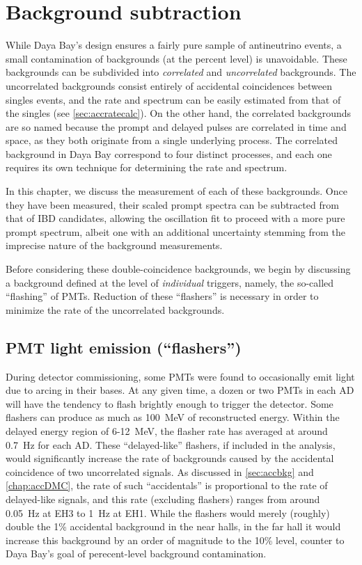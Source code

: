 \documentclass[../thesis.tex]{subfiles}
\begin{document}
\chapter{Background subtraction}
\label{chap:bkg}

While Daya Bay's design ensures a fairly pure sample of antineutrino events, a small contamination of backgrounds (at the percent level) is unavoidable. These backgrounds can be subdivided into \emph{correlated} and \emph{uncorrelated} backgrounds. The uncorrelated backgrounds consist entirely of accidental coincidences between singles events, and the rate and spectrum can be easily estimated from that of the singles (see \autoref{sec:accratecalc}). On the other hand, the correlated backgrounds are so named because the prompt and delayed pulses are correlated in time and space, as they both originate from a single underlying process. The correlated background in Daya Bay correspond to four distinct processes, and each one requires its own technique for determining the rate and spectrum.

In this chapter, we discuss the measurement of each of these backgrounds. Once they have been measured, their scaled prompt spectra can be subtracted from that of IBD candidates, allowing the oscillation fit to proceed with a more pure prompt spectrum, albeit one with an additional uncertainty stemming from the imprecise nature of the background measurements.

Before considering these double-coincidence backgrounds, we begin by discussing a background defined at the level of \emph{individual} triggers, namely, the so-called ``flashing'' of PMTs. Reduction of these ``flashers'' is necessary in order to minimize the rate of the uncorrelated backgrounds.

\section{PMT light emission (``flashers'')}
\label{sec:bkgFlashers}

During detector commissioning, some PMTs were found to occasionally emit light due to arcing in their bases. At any given time, a dozen or two PMTs in each AD will have the tendency to flash brightly enough to trigger the detector. Some flashers can produce as much as 100~MeV of reconstructed energy. Within the delayed energy region of 6-12~MeV, the flasher rate has averaged at around 0.7~Hz for each AD. These ``delayed-like'' flashers, if included in the analysis, would significantly increase the rate of backgrounds caused by the accidental coincidence of two uncorrelated signals. As discussed in \autoref{sec:accbkg} and \autoref{chap:accDMC}, the rate of such ``accidentals'' is proportional to the rate of delayed-like signals, and this rate (excluding flashers) ranges from around 0.05~Hz at EH3 to 1~Hz at EH1. While the flashers would merely (roughly) double the 1\% accidental background in the near halls, in the far hall it would increase this background by an order of magnitude to the 10\% level, counter to Daya Bay's goal of perecent-level background contamination.
\end{document}
